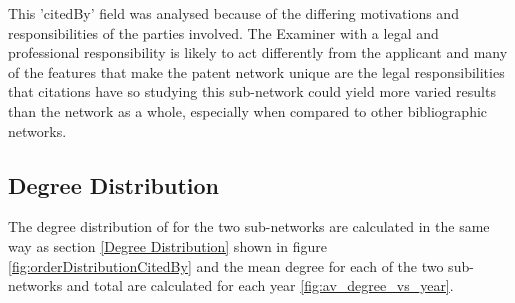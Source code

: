 This 'citedBy' field was analysed because of the differing motivations and responsibilities of the parties involved. The Examiner with a legal and professional responsibility is likely to act differently from the applicant and many of the features that make the patent network unique are the legal responsibilities that citations have so studying this sub-network could yield more varied results than the network as a whole, especially when compared to other bibliographic networks. 

\subsection{Degree Distribution}
The degree distribution of for the two sub-networks are calculated in the same way as section \ref{Degree Distribution} shown in figure \ref{fig:orderDistributionCitedBy} and the mean degree for each of the two sub-networks and total are calculated for each year \ref{fig:av_degree_vs_year}.

